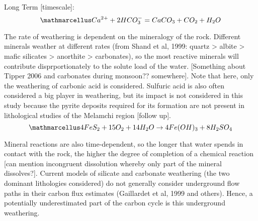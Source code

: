 \begin{tcolorbox}
{\begin{center}
    Long Term [timescale]:
    \[
    \ttmath{Ca^{2+} + 2HCO_3^- = CaCO_3 + CO_2 + H_2O}
    \]
    
    \end{center}

The rate of weathering is dependent on the mineralogy of the rock. Different minerals weather at different rates (from Shand et al, 1999: quartz > albite > mafic silicates > anorthite > carbonates), so the most reactive minerals will contribute disprportionately to the solute load of the water. [Something about Tipper 2006 and carbonates during monsoon?? somewhere]. Note that here, only the weathering of carbonic acid is considered. Sulfuric acid is also often considered a big player in weathering, but its impact is not considered in this study because the pyrite deposits required for its formation are not present in lithological studies of the Melamchi region [follow up].
\[
\ttmath{4FeS_2 + 15O_2 + 14H_2O \rightarrow 4Fe(OH)_3 + 8H_2SO_4}
\] 

Mineral reactions are also time-dependent, so the longer that water spends in contact with the rock, the higher the degree of completion of a chemical reaction [can mention incongruent dissolution whereby only part of the mineral dissolves?]. Current models of silicate and carbonate weathering (the two dominant lithologies considered) do not generally consider underground flow paths in their carbon flux estimates (Gaillardet et al, 1999 and others). Hence, a potentially underestimated part of the carbon cycle is this underground weathering.

}
\end{tcolorbox}


\newpage







